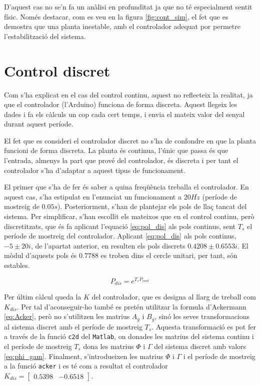 \documentclass[12pt,a4paper,final,twoside,openright]{report}
\begin{document}
D'aquest cas no se'n fa un anàlisi en profunditat ja que no té especialment sentit físic. Només destacar, com es veu en la figura \ref{fig:cont_sim}, el fet que es demostra que una planta inestable, amb el controlador adequat por permetre l'estabilització del sistema.

\section{Control discret}

Com s'ha explicat en el cas del control continu, aquest no reflecteix la realitat, ja que el controlador (l'Arduino) funciona de forma discreta. Aquest llegeix les dades i fa els càlculs un cop cada cert temps, i envia el mateix valor del senyal durant aquest període.

El fet que es consideri el controlador discret no s'ha de confondre en que la planta funcioni de forma discreta. La planta és continua, l'únic que passa és que l'entrada, almenys la part que prové del controlador, és discreta i per tant el controlador s'ha d'adaptar a aquest tipus de funcionament. 

El primer que s'ha de fer és saber a quina freqüència treballa el controlador. En aquest cas, s'ha estipulat en l'enunciat un funcionament a $20 Hz$ (període de mostreig de $0.05 s$). Posteriorment, s'han de plantejar els pols de llaç tancat del sistema. Per simplificar, s'han escollit els mateixos que en el control continu, però discretitzats, que és fa aplicant l'equació \eqref{eq:pol_dis} als pols continus, sent $T_s$ el període de mostreig del controlador. Aplicant \eqref{eq:pol_dis} als pols continus, $-5\pm20i$, de l'apartat anterior, en resulten els pols discrets $0.4208\pm0.6553i$. El mòdul d'aquests pols és $0.7788$ es troben dins el cercle unitari, per tant, són estables. 

\begin{equation}\label{eq:pol_dis}
P_{dis} = e^{T_s P_{cont}}
\end{equation}
\vspace{10pt}


Per últim càlcul queda la $K$ del controlador, que es designa al llarg de treball com $K_{dis}$. Per tal d'aconseguir-ho també es pretén utilitzar la formula d'Ackermann \eqref{eq:Acker}, però no s'utilitzen les matrius $A_g$ i $B_g$, sinó les seves transformacions al sistema discret amb el període de mostreig $T_s$. Aquesta transformació es pot fer a través de la funció \texttt{c2d} del \texttt{Matlab}, on donades les matrius del sistema continu i el període de mostreig $T_s$ dona les matrius $\Phi$ i $\Gamma$ del sistema discret amb valors \eqref{eq:phi_gam}. Finalment, s'introdueixen les matrius $\Phi$ i $\Gamma$ i el període de mostreig a la funció \texttt{acker} i es té com a resultat el controlador $K_{dis} = \begin{bmatrix}
0.5398 & -0.6518
\end{bmatrix}$.\label{pag:trans_phi_gam}
\end{document}
